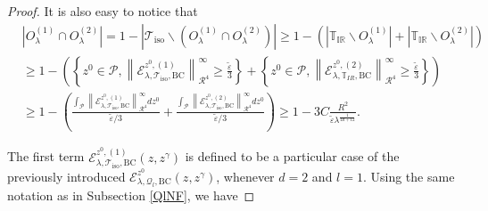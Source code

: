 \documentclass{amsart}
\theoremstyle{definition}
\theoremstyle{remark}
\newcommand{\ep}{\varepsilon}
\renewcommand\geq\geqslant
\numberwithin{equation}{section}
\theoremstyle{definition}
\theoremstyle{remark}
\begin{document}
\begin{proof}
	It is also easy to notice that
	\begin{equation}
		\begin{aligned}
			&\left|O_\lambda^{(1)}\cap O_\lambda^{(2)}\right|=1-\left|\mathcal{T}_\mathrm{iso}\backslash\left(O_\lambda^{(1)}\cap O_\lambda^{(2)}\right)\right|\geq1-\left(\left|\mathbb{T_{IR}}\backslash O_\lambda^{(1)}\right|+\left|\mathbb{T_{IR}}\backslash O_\lambda^{(2)}\right|\right) \\&\geq1-\left(\left\{z^0\in \mathcal{P},\left\|\mathcal{E}_{\lambda,\mathcal{T}_\mathrm{iso},\mathrm{BC}}^{z^0,(1)}\right\|_{\mathcal{R}^{4}}^{\infty}\geq\frac{\tilde{\ep}}{3} \right\}+\left\{z^0\in \mathcal{P},\left\|\mathcal{E}_{\lambda,\mathbb{T}_ {IR},\mathrm{BC}}^{z^0,(2)}\right\|_{\mathcal{R}^{4}}^{\infty}\geq\frac{\tilde{\ep}}{3} \right\}\right)\\&\geq1-\left(\frac{	\int_{\mathcal{P}}\left\|\mathcal{E}_{\lambda,\mathcal{T}_\mathrm{iso},\mathrm{BC}}^{z^0,(1)}\right\|_{\mathcal{R}^{4}}^{\infty} d z^0}{\tilde{\ep}/3}+\frac{	\int_{\mathcal{P}}\left\|\mathcal{E}_{\lambda,\mathcal{T}_\mathrm{iso},\mathrm{BC}}^{z^0,(2)}\right\|_{\mathcal{R}^{4}}^{\infty} d z^0}{\tilde{\ep}/3}\right)\geq 1-3C \frac{R^{2}}{\tilde{\ep}\lambda^{\frac{1}{4d+12}}}.
		\end{aligned}
	\end{equation}
	
	The first term  $\mathcal{E}_{\lambda,\mathcal{T}_\mathrm{iso},\mathrm{BC}}^{z^0, (1)}(z,z^\gamma)$ is defined to be a particular case of the previously introduced $\mathcal{E}_{\lambda,\mathcal{Q}_l,\mathrm{BC}}^{z^0}(z,z^\gamma)$, whenever $d=2$ and $l=1$. Using the same notation as in Subsection \ref{QlNF},
	we have
	

\end{proof}
\end{document}
